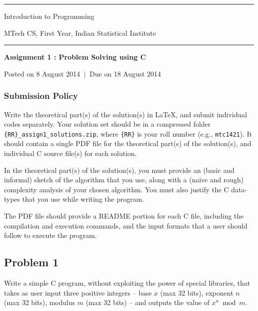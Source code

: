 \documentclass[11pt,a4paper]{article}
\begin{document}
\pagestyle{empty}

\begin{center}
  \hrule
  \vspace*{10pt}
  
  {\huge Introduction to Programming}

  \vspace*{10pt}

  {\large MTech CS, First Year, Indian Statistical Institute}
  
  \vspace*{10pt}  
  \hrule
  \vspace*{20pt}
  
  \textbf{\Large Assignment 1 : Problem Solving using C}

  Posted on 8 August 2014 $ \ \vert \ $ Due on 18 August 2014

  \vspace*{10pt}
  
\end{center}

\subsubsection*{Submission Policy}

Write the theoretical part(s) of the solution(s) in \LaTeX, and submit individual codes separately. Your solution set should be in a compressed folder \texttt{\{RR\}\_assign1\_solutions.zip}, where \texttt{\{RR\}} is your roll number (e.g., \texttt{mtc1421}). It should contain a single PDF file for the theoretical part(s) of the solution(s), and individual C source file(s) for each solution.  

In the theoretical part(s) of the solution(s), you must provide an (basic and informal) sketch of the algorithm that you use, along with a (naive and rough) complexity analysis of your chosen algorithm. You must also justify the C data-types that you use while writing the program.

The PDF file should provide a README portion for each C file, including the compilation and execution commands, and the input formats that a user should follow to execute the program.


\subsection*{Problem 1}

Write a simple C program, without exploiting the power of special libraries, that takes as user input three positive integers -- base $x$ (max 32 bits), exponent $n$ (max 32 bits), modulus $m$ (max 32 bits) -- and outputs the value of $x^n \bmod{m}$.
\end{document}
